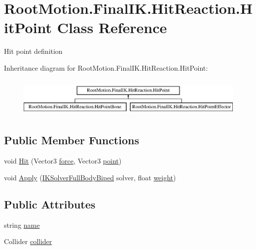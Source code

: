\hypertarget{class_root_motion_1_1_final_i_k_1_1_hit_reaction_1_1_hit_point}{}\section{Root\+Motion.\+Final\+I\+K.\+Hit\+Reaction.\+Hit\+Point Class Reference}
\label{class_root_motion_1_1_final_i_k_1_1_hit_reaction_1_1_hit_point}


Hit point definition  


Inheritance diagram for Root\+Motion.\+Final\+I\+K.\+Hit\+Reaction.\+Hit\+Point\+:\begin{figure}[H]
\begin{center}
\leavevmode
\includegraphics[height=1.958042cm]{class_root_motion_1_1_final_i_k_1_1_hit_reaction_1_1_hit_point}
\end{center}
\end{figure}
\subsection*{Public Member Functions}
\begin{DoxyCompactItemize}
\item 
void \mbox{\hyperlink{class_root_motion_1_1_final_i_k_1_1_hit_reaction_1_1_hit_point_ab1a6f2e138256850005351f2c7c9ccf5}{Hit}} (Vector3 \mbox{\hyperlink{class_root_motion_1_1_final_i_k_1_1_hit_reaction_1_1_hit_point_a2505f1cc74327b1cc9beff520d04992a}{force}}, Vector3 \mbox{\hyperlink{class_root_motion_1_1_final_i_k_1_1_hit_reaction_1_1_hit_point_ad6c8a087339db0f4f417b042a3fffd92}{point}})
\item 
void \mbox{\hyperlink{class_root_motion_1_1_final_i_k_1_1_hit_reaction_1_1_hit_point_a8a0015511ee68f5552a429805bf9fe3c}{Apply}} (\mbox{\hyperlink{class_root_motion_1_1_final_i_k_1_1_i_k_solver_full_body_biped}{I\+K\+Solver\+Full\+Body\+Biped}} solver, float \mbox{\hyperlink{class_root_motion_1_1_final_i_k_1_1_offset_modifier_a3a2cd2134e8a197e6a77b48fcf9aa5d4}{weight}})
\end{DoxyCompactItemize}
\subsection*{Public Attributes}
\begin{DoxyCompactItemize}
\item 
string \mbox{\hyperlink{class_root_motion_1_1_final_i_k_1_1_hit_reaction_1_1_hit_point_a2463110c206268d30d4f27fac250ac22}{name}}
\item 
Collider \mbox{\hyperlink{class_root_motion_1_1_final_i_k_1_1_hit_reaction_1_1_hit_point_a346400f8ed3f40bba426218e966795a8}{collider}}
\end{DoxyCompactItemize}
